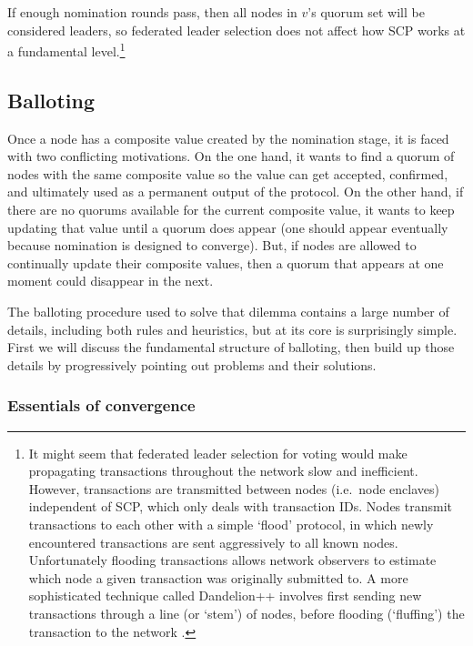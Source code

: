 If enough nomination rounds pass, then all nodes in $v$'s quorum set will be considered leaders, so federated leader selection does not affect how SCP works at a fundamental level.\footnote{It might seem that federated leader selection for voting would make propagating transactions throughout the network slow and inefficient. However, transactions are transmitted between nodes  (i.e.\ node enclaves) independent of SCP, which only deals with transaction IDs. Nodes transmit transactions to each other with a simple `flood' protocol, in which newly encountered transactions are sent aggressively to all known nodes. Unfortunately flooding transactions allows network observers to estimate which node a given transaction was originally submitted to. A more sophisticated technique called Dandelion++ involves first sending new transactions through a line (or `stem') of nodes, before flooding (`fluffing') the transaction to the network \cite{dandelion-plus-plus}.}%


\subsection{Balloting}
\label{subsec:consensus-balloting}

Once a node has a composite value created by the nomination stage, it is faced with two conflicting motivations. On the one hand, it wants to find a quorum of nodes with the same composite value so the value can get accepted, confirmed, and ultimately used as a permanent output of the protocol. On the other hand, if there are no quorums available for the current composite value, it wants to keep updating that value until a quorum does appear (one should appear eventually because nomination is designed to converge). But, if nodes are allowed to continually update their composite values, then a quorum that appears at one moment could disappear in the next.

The balloting procedure used to solve that dilemma contains a large number of details, including both rules and heuristics, but at its core is surprisingly simple. First we will discuss the fundamental structure of balloting, then build up those details by progressively pointing out problems and their solutions.

\subsubsection{Essentials of convergence}

